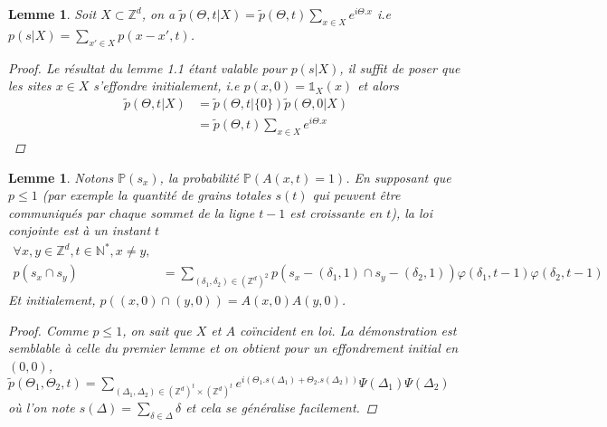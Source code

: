 \documentclass{article}
\newtheorem{lemma}[theorem]{Lemme}
\theoremstyle{definition}
\begin{document}
\begin{lemma}
	Soit $X\subset \mathbb{Z}^d$, on a $\tilde{p}(\Theta, t|X) = \tilde{p}(\Theta, t)\sum_{x\in X}e^{i\Theta.x}$ i.e $p(s|X)=\sum_{x'\in X}p(x-x',t)$.
	\begin{proof}
		Le résultat du lemme 1.1 étant valable pour $p(s|X)$, il suffit de poser que les sites $x\in X$ s'effondre initialement, i.e $p(x,0) = \mathds{1}_X(x)$ et alors \begin{align*}
			\tilde{p}(\Theta, t|X)&=\tilde{p}(\Theta,t|\{0\})\tilde{p}(\Theta,0|X)\\
					      &=\tilde{p}(\Theta, t)\sum_{x\in X}e^{i\Theta.x}
		\end{align*}
	\end{proof}
\end{lemma}

\begin{lemma}
	Notons $\mathds{P}(s_x)$, la probabilité $\mathds{P}(A(x,t) = 1)$. En supposant que $p\leq 1$ (par exemple la quantité de grains totales $s(t)$ qui peuvent être communiqués par chaque sommet de la ligne $t-1$ est croissante en $t$), la loi conjointe est à un instant $t$
\begin{align*}
	\forall x, y\in \mathbb{Z}^d, t\in\mathbb{N}^*, x\neq y, \\p(s_x \cap s_y) &= \sum_{(\delta_1,\delta_2)\in (\mathbb{Z}^d)^2} p(s_x-(\delta_1, 1) \cap s_y-(\delta_2,1))\varphi(\delta_1,t-1)\varphi(\delta_2,t-1)\label{1}\tag{1}
\end{align*} 
Et initialement, $p((x,0)\cap (y,0)) = A(x,0)A(y,0)$. \begin{proof}
	Comme $p\leq 1$, on sait que $X$ et $A$ coïncident en loi. 
	La démonstration est semblable à celle du premier lemme et on obtient pour un effondrement initial en $(0,0)$, $\tilde{p}(\Theta_1, \Theta_2, t)=\sum_{(\Delta_1,\Delta_2)\in (\mathbb{Z}^d)^t\times(\mathbb{Z}^d)^t} e^{i(\Theta_1.s(\Delta_1)+\Theta_2.s(\Delta_2))} \Psi(\Delta_1)\Psi(\Delta_2)$ où l'on note $s(\Delta) = \sum_{\delta\in \Delta}\delta$ et cela se généralise facilement.
\end{proof}
\end{lemma}
\end{document}
